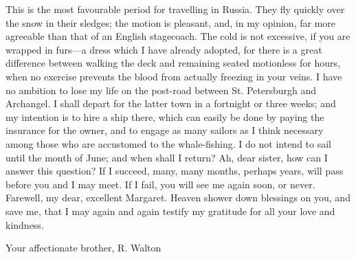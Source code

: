 This is the most favourable period for travelling in Russia. They fly quickly over the snow in their sledges; the motion is pleasant, and, in my opinion, far more agreeable than that of an English stagecoach. The cold is not excessive, if you are wrapped in furs---a dress which I have already adopted, for there is a great difference between walking the deck and remaining seated motionless for hours, when no exercise prevents the blood from actually freezing in your veins. I have no ambition to lose my life on the post-road between St. Petersburgh and Archangel. I shall depart for the latter town in a fortnight or three weeks; and my intention is to hire a ship there, which can easily be done by paying the insurance for the owner, and to engage as many sailors as I think necessary among those who are accustomed to the whale-fishing. I do not intend to sail until the month of June; and when shall I return? Ah, dear sister, how can I answer this question? If I succeed, many, many months, perhaps years, will pass before you and I may meet. If I fail, you will see me again soon, or never. Farewell, my dear, excellent Margaret. Heaven shower down blessings on you, and save me, that I may again and again testify my gratitude for all your love and kindness.

Your affectionate brother,     R. Walton